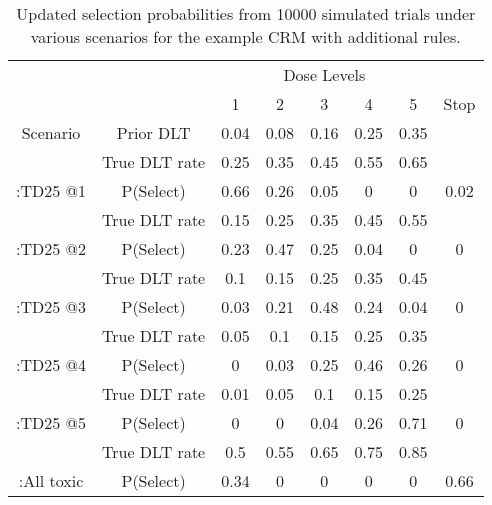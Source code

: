 \begin{table}[H]
	
	\caption{\label{tab_tite-dtp:UpdatedCRMsimsexample}Updated selection probabilities from 10000 simulated trials under various scenarios for the example CRM with additional rules.}
	\centering
	\begin{tabular}[t]{cccccccc}
		\toprule
		\multicolumn{2}{c}{ } & \multicolumn{5}{c}{Dose Levels} \\
		\cmidrule(l{3pt}r{3pt}){3-7}
		&   & 1 & 2 & 3 & 4 & 5 & Stop\\
		\midrule
		Scenario & Prior DLT & 0.04 & 0.08 & 0.16 & 0.25 & 0.35 & \\
		\cmidrule{1-8}
		& True DLT rate & 0.25 & 0.35 & 0.45 & 0.55 & 0.65 & \\
		
		\multirow{-2}{*}{\centering\arraybackslash 1:TD25 @1} & P(Select) & 0.66 & 0.26 & 0.05 & 0 & 0 & 0.02\\
		\cmidrule{1-8}
		& True DLT rate & 0.15 & 0.25 & 0.35 & 0.45 & 0.55 & \\
		
		\multirow{-2}{*}{\centering\arraybackslash 2:TD25 @2} & P(Select) & 0.23 & 0.47 & 0.25 & 0.04 & 0 & 0\\
		\cmidrule{1-8}
		& True DLT rate & 0.1 & 0.15 & 0.25 & 0.35 & 0.45 & \\
		
		\multirow{-2}{*}{\centering\arraybackslash 3:TD25 @3} & P(Select) & 0.03 & 0.21 & 0.48 & 0.24 & 0.04 & 0\\
		\cmidrule{1-8}
		& True DLT rate & 0.05 & 0.1 & 0.15 & 0.25 & 0.35 & \\
		
		\multirow{-2}{*}{\centering\arraybackslash 4:TD25 @4} & P(Select) & 0 & 0.03 & 0.25 & 0.46 & 0.26 & 0\\
		\cmidrule{1-8}
		& True DLT rate & 0.01 & 0.05 & 0.1 & 0.15 & 0.25 & \\
		
		\multirow{-2}{*}{\centering\arraybackslash 5:TD25 @5} & P(Select) & 0 & 0 & 0.04 & 0.26 & 0.71 & 0\\
		\cmidrule{1-8}
		& True DLT rate & 0.5 & 0.55 & 0.65 & 0.75 & 0.85 & \\
		
		\multirow{-2}{*}{\centering\arraybackslash 6:All toxic} & P(Select) & 0.34 & 0 & 0 & 0 & 0 & 0.66\\
		\bottomrule
	\end{tabular}
\end{table}

